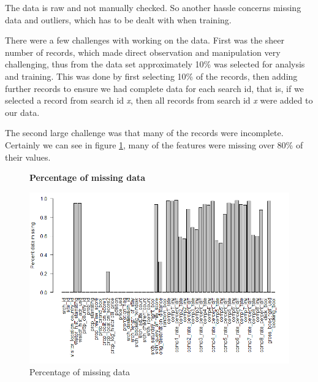 \documentclass{llncs}
\begin{document}
The data is raw and not manually checked. So another hassle concerns missing data and outliers, which has to be dealt with when training. 

	There were a few challenges with working on the data. First was the sheer number of records, which made direct observation and manipulation very challenging, thus from the data set approximately 10\% was selected for analysis and training. This was done by first selecting 10\% of the records, then adding further records to ensure we had complete data for each search id, that is, if we selected a record from search id \textit{x}, then all records from search id \textit{x} were added to our data.

	The second large challenge was that many of the records were incomplete. Certainly we can see in figure \ref{fig:pctM}, many of the features were missing over 80\% of their values.
	\begin{figure}[H]
	\centering
	\textbf{Percentage of missing data}\par\medskip
		\includegraphics[scale=0.4]{figures/pct_missing.png}
	\caption{Percentage of missing data}
	\label{fig:pctM}
	\end{figure}
	
\end{document}
